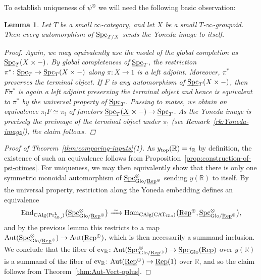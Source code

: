 \documentclass[reqno]{memo-l}
\theoremstyle{mythm}
\newtheorem{lemma}[thm]{Lemma}
\theoremstyle{definition}
\numberwithin{equation}{section}
\newcommand{\R} {{\mathbb{R}}}
\DeclareMathOperator{\ev}{ev}
\DeclareMathOperator{\Spc}{Spc}
\DeclareMathOperator{\CAT}{CAT}
\newcommand{\PrL}{\textup{Pr}^{\textup{L}}}
\renewcommand{\top}{{\textup{top}}}
\renewcommand{\hom}{\textup{hom}}
\renewcommand{\hom}{{\textup{Hom}}}
\newcommand{\End}{{\textup{End}}}
\DeclareMathOperator{\CAlg}{\textup{CAlg}}
\newcommand{\Glo}{\textup{Glo}}
\newcommand{\Aut}{\textup{Aut}}
\newcommand{\ulhelper}[2]{\underline{\setbox0=\hbox{$#1#2$}\dp0=0.4pt \box0\relax}}
\newcommand{\ul}[1]{{\mathpalette\ulhelper{#1}}\hbox{\rule[-2pt]{0pt}{0pt}}}
\newcommand{\iso}{\xrightarrow{\;\smash{\raisebox{-0.25ex}{\ensuremath{\scriptstyle\sim}}}\;}}
\newcommand{\Vect}{\textup{Rep}}
\begin{document}
To establish uniqueness of $\psi^\otimes$ we will need the following basic observation:

\begin{lemma}
    Let $T$ be a small $\infty$-category, and let $X$ be a small $T$-$\infty$-groupoid. Then every automorphism of $\ul\Spc_{T/X}$ sends the Yoneda image to itself.
    \begin{proof}
        Again, we may equivalently use the model of the global completion as $\ul\Spc_{T}(X\times{-})$.
        By global completeness of $\ul\Spc_T$, the restriction $\pi^*\colon\ul\Spc_T\to\ul\Spc_{T}(X\times{-})$ along $\pi\colon X\to 1$ is a left adjoint. Moreover, $\pi^*$ preserves the terminal object. If $F$ is any automorphism of $\ul\Spc_{T}(X\times{-})$, then $F\pi^*$ is again a left adjoint preserving the terminal object and hence is equivalent to $\pi^*$ by the universal property of $\ul\Spc_T$. Passing to mates, we obtain an equivalence $\pi_!F\simeq\pi_!$ of functors $\ul\Spc_{T}(\ul X\times{-})\to\ul\Spc_T$. As the Yoneda image is precisely the preimage of the terminal object under $\pi_!$ (see Remark~\ref{rk:Yoneda-image}), the claim follows.  
    \end{proof}
\end{lemma}

\begin{proof}[Proof of Theorem~\ref{thm:comparing-inputs}(1)]
    As $y_\top(\R)=i_\R$ by definition, the existence of such an equivalence follows from Proposition~\ref{prop:construction-of-psi-otimes}. For uniqueness, we may then equivalently show that there is only one symmetric monoidal automorphism of $\ul\Spc_{\Glo/\ul\Vect^\oplus}^\otimes$ sending $y(\R)$ to itself. By the universal property, restriction along the Yoneda embedding defines an equivalence 
    \[
        \smash{\End_{\CAlg(\PrL_{\Glo})}\big(\ul\Spc_{\Glo/\ul\Vect^\oplus}^\otimes\big)\iso\hom_{\CAlg(\CAT_\Glo)}\big(\ul\Vect^\oplus,\ul\Spc_{\Glo/\ul\Vect^\oplus}^\otimes\big)},
    \]
    and by the previous lemma this restricts to a map $\Aut(\ul\Spc_{\Glo/\ul\Vect^\oplus}^\otimes)\to\Aut(\ul\Vect^\oplus)$, which is then necessarily a summand inclusion. We conclude that the fiber of $\ev_\R\colon\Aut(\ul\Spc_{\Glo/\ul\Vect^\oplus}^\otimes)\to\ul\Spc_{\Glo}(\ul\Vect)$ over $y(\R)$ is a summand of the fiber of $\ev_\R\colon\Aut(\ul\Vect^\oplus)\to\ul\Vect(1)$ over $\R$, and so the claim follows from Theorem~\ref{thm:Aut-Vect-oplus}.
\end{proof}
\end{document}
